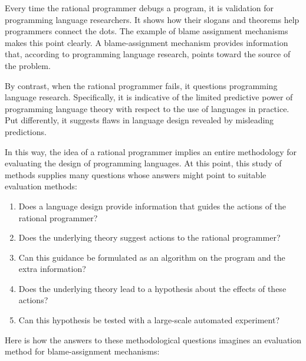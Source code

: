

Every time the rational programmer debugs a program, it is validation for
programming language researchers. It shows how their slogans and theorems help
programmers connect the dots. The example of blame assignment mechanisms makes
this point clearly. A blame-assignment mechanism provides information that,
according to programming language research, points toward the source of the
problem.

By contrast, when the rational programmer fails, it questions programming
language research. Specifically, it is indicative of the limited predictive
power of programming language theory with respect to the use of languages in
practice. Put differently, it suggests flaws in language design revealed by
misleading predictions.

In this way, the idea of a rational programmer implies an entire methodology for
evaluating the design of programming languages. At this point, this study of
methods supplies many questions whose answers might point to suitable evaluation
methods: 

\begin{enumerate} 

\item Does a language design provide information that guides the actions of the
 rational programmer?

\item Does the underlying theory suggest actions to the rational programmer?

\item Can this guidance be formulated as an algorithm on the program and the extra
information?

\item Does the underlying theory lead to a hypothesis about the effects of
 these actions? 

\item Can this hypothesis be tested with a large-scale automated experiment?

\end{enumerate}

Here is how the answers to these methodological questions imagines an evaluation
method for blame-assignment mechanisms: 

